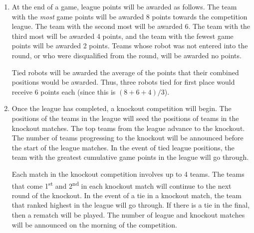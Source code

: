 \begin{enumerate}
\item At the end of a game, league points will be awarded as follows.
      The team with the \emph{most} game points will be awarded 8 points towards the competition league.
      The team with the second most will be awarded 6.
      The team with the third most will be awarded 4 points, and the team with the fewest game points will be awarded 2 points.
      Teams whose robot was not entered into the round, or who were disqualified from the round, will be awarded no points.

      Tied robots will be awarded the average of the points that their combined positions would be awarded.
      Thus, three robots tied for first place would receive 6 points each (since this is $(8+6+4)/3$).

\item Once the league has completed, a knockout competition will begin.
      The positions of the teams in the league will seed the positions of teams in the knockout matches.
      The top teams from the league advance to the knockout.
      The number of teams progressing to the knockout will be announced before the start of the league matches.
      In the event of tied league positions, the team with the greatest cumulative game points in the league will go through.

      Each match in the knockout competition involves up to 4 teams.
      The teams that come 1\textsuperscript{st} and 2\textsuperscript{nd} in each knockout match will continue to the next round of the knockout.
      In the event of a tie in a knockout match, the team that ranked highest in the league will go through.
      If there is a tie in the final, then a rematch will be played.
      The number of league and knockout matches will be announced on the morning of the competition.

\end{enumerate}
